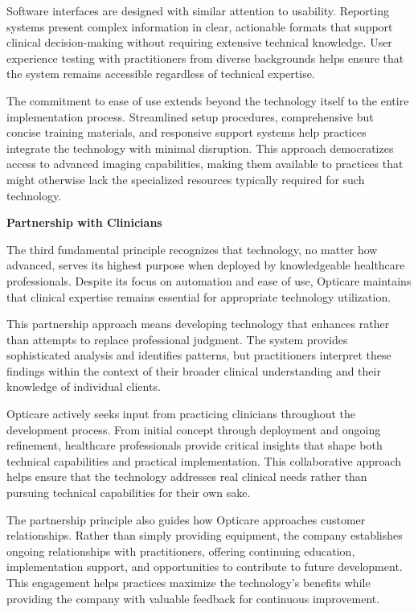 \documentclass[
  Letterpaper,
]{scrbook}
\begin{document}
Software interfaces are designed with similar attention to usability.
Reporting systems present complex information in clear, actionable
formats that support clinical decision-making without requiring
extensive technical knowledge. User experience testing with
practitioners from diverse backgrounds helps ensure that the system
remains accessible regardless of technical expertise.

The commitment to ease of use extends beyond the technology itself to
the entire implementation process. Streamlined setup procedures,
comprehensive but concise training materials, and responsive support
systems help practices integrate the technology with minimal disruption.
This approach democratizes access to advanced imaging capabilities,
making them available to practices that might otherwise lack the
specialized resources typically required for such technology.

\textbf{Partnership with Clinicians}

The third fundamental principle recognizes that technology, no matter
how advanced, serves its highest purpose when deployed by knowledgeable
healthcare professionals. Despite its focus on automation and ease of
use, Opticare maintains that clinical expertise remains essential for
appropriate technology utilization.

This partnership approach means developing technology that enhances
rather than attempts to replace professional judgment. The system
provides sophisticated analysis and identifies patterns, but
practitioners interpret these findings within the context of their
broader clinical understanding and their knowledge of individual
clients.

Opticare actively seeks input from practicing clinicians throughout the
development process. From initial concept through deployment and ongoing
refinement, healthcare professionals provide critical insights that
shape both technical capabilities and practical implementation. This
collaborative approach helps ensure that the technology addresses real
clinical needs rather than pursuing technical capabilities for their own
sake.

The partnership principle also guides how Opticare approaches customer
relationships. Rather than simply providing equipment, the company
establishes ongoing relationships with practitioners, offering
continuing education, implementation support, and opportunities to
contribute to future development. This engagement helps practices
maximize the technology's benefits while providing the company with
valuable feedback for continuous improvement.
\end{document}
